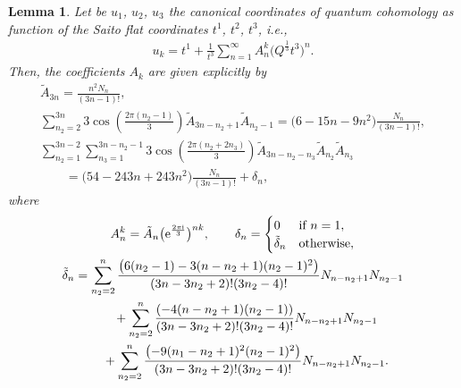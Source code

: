 \documentclass[pdftex]{sigma}
\numberwithin{equation}{section}
\newtheorem{Lemma}[Theorem]{Lemma}
\begin{document}
\begin{Lemma}
Let be $u_1$, $u_2$, $u_3$ the canonical coordinates of quantum cohomology as function of the Saito flat coordinates $t^1$, $t^2$, $t^3$, i.e.,
\begin{gather}\label{canonical coordinates lemma appendix}
u_k=t^1+\frac{1}{t^3}\sum_{n=1}^{\infty} A_n^k \bigl( Q^{\frac{1}{3}}t^3 \bigr)^n.
\end{gather}
Then, the coefficients $A_{k}$ are given explicitly by
\begin{gather*}
\tilde A_{3n}=\frac{n^2N_n}{(3n-1)! },\\
\sum_{n_2=2}^{3n}3\cos\left( \frac{2\pi (n_2-1)}{3}\right) \tilde A_{3n-n_2+1} \tilde A_{n_2-1}=\bigl(6-15n-9n^2 \bigr)\frac{N_n}{(3n-1)!},\\
\sum_{n_2=1}^{3n-2}\sum_{n_3=1}^{3n-n_2-1}3\cos\left( \frac{2\pi (n_2+2n_3 )}{3} \right) \tilde A_{3n-n_2-n_3} \tilde A_{n_2} \tilde A_{n_3}\\
\qquad=\bigl(54-243n +243n^2\bigr)\frac{N_n}{(3n-1)!}+\delta_{n} ,
\end{gather*}
where
\begin{gather*}
A_n^k=\tilde A_n \bigl( {\rm e}^{\frac{2\pi {\rm i}}{3}}\bigr)^{nk},
\qquad
\delta_n=
\begin{cases}
0& \text{if } n=1,\\
 \tilde\delta_n & \text{otherwise},
\end{cases}
\\
\tilde\delta_n=\sum_{n_2=2}^{n}\frac{\bigl(6(n_2-1)-3(n-n_2+1)(n_2-1)^2 \bigr)}{(3n-3n_2+2)!(3n_2-4)!} N_{n-n_2+1}N_{n_2-1}\\
\phantom{\tilde\delta_n=}{}+\sum_{n_2=2}^{n}\frac{(-4(n-n_2+1)(n_2-1) )}{(3n-3n_2+2)!(3n_2-4)!} N_{n-n_2+1}N_{n_2-1}\\
\phantom{\tilde\delta_n=}{}+\sum_{n_2=2}^{n}\frac{\bigl(-9(n_1-n_2+1)^2(n_2-1)^2 \bigr)}{(3n-3n_2+2)!(3n_2-4)!} N_{n-n_2+1}N_{n_2-1}.
\end{gather*}
\end{Lemma}
\end{document}
